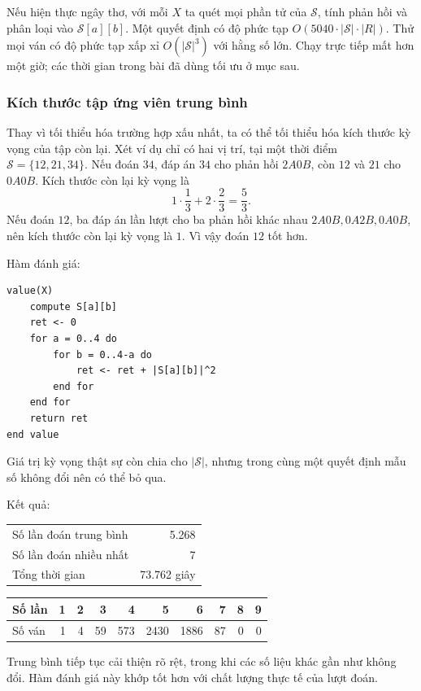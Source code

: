 \documentclass[11pt]{article}
\newcommand{\AB}[2]{#1A#2B}
\newcommand{\SetS}{\mathcal{S}}
\begin{document}
Nếu hiện thực ngây thơ, với mỗi \(X\) ta quét mọi phần tử của \(\SetS\), tính
phản hồi và phân loại vào \(\SetS[a][b]\). Một quyết định có độ phức tạp
\(O(5040\cdot |\SetS|\cdot |R|)\). Thử mọi ván có độ phức tạp xấp xỉ
\(O(|\SetS|^3)\) với hằng số lớn. Chạy trực tiếp mất hơn một giờ; các thời
gian trong bài đã dùng tối ưu ở mục sau.

\subsubsection{Kích thước tập ứng viên trung bình}

Thay vì tối thiểu hóa trường hợp xấu nhất, ta có thể tối thiểu hóa kích thước
kỳ vọng của tập còn lại. Xét ví dụ chỉ có hai vị trí, tại một thời điểm
\(\SetS=\{12,21,34\}\). Nếu đoán \(34\), đáp án \(34\) cho phản hồi
\(\AB{2}{0}\), còn \(12\) và \(21\) cho \(\AB{0}{0}\). Kích thước còn lại kỳ
vọng là
\[
  1\cdot \frac13 + 2\cdot \frac23 = \frac53.
\]
Nếu đoán \(12\), ba đáp án lần lượt cho ba phản hồi khác nhau
\(\AB{2}{0},\AB{0}{2},\AB{0}{0}\), nên kích thước còn lại kỳ vọng là \(1\).
Vì vậy đoán \(12\) tốt hơn.

Hàm đánh giá:
\begin{verbatim}
value(X)
    compute S[a][b]
    ret <- 0
    for a = 0..4 do
        for b = 0..4-a do
            ret <- ret + |S[a][b]|^2
        end for
    end for
    return ret
end value
\end{verbatim}
Giá trị kỳ vọng thật sự còn chia cho \(|\SetS|\), nhưng trong cùng một quyết
định mẫu số không đổi nên có thể bỏ qua.

Kết quả:
\begin{center}
\small
\begin{tabular}{|l|r|}
\hline
Số lần đoán trung bình & 5.268 \\
Số lần đoán nhiều nhất & 7 \\
Tổng thời gian & 73.762 giây \\
\hline
\end{tabular}

\medskip
\begin{tabular}{|l|rrrrrrrrr|}
\hline
Số lần & 1 & 2 & 3 & 4 & 5 & 6 & 7 & 8 & 9 \\
\hline
Số ván & 1 & 4 & 59 & 573 & 2430 & 1886 & 87 & 0 & 0 \\
\hline
\end{tabular}
\end{center}

Trung bình tiếp tục cải thiện rõ rệt, trong khi các số liệu khác gần như không
đổi. Hàm đánh giá này khớp tốt hơn với chất lượng thực tế của lượt đoán.
\end{document}
